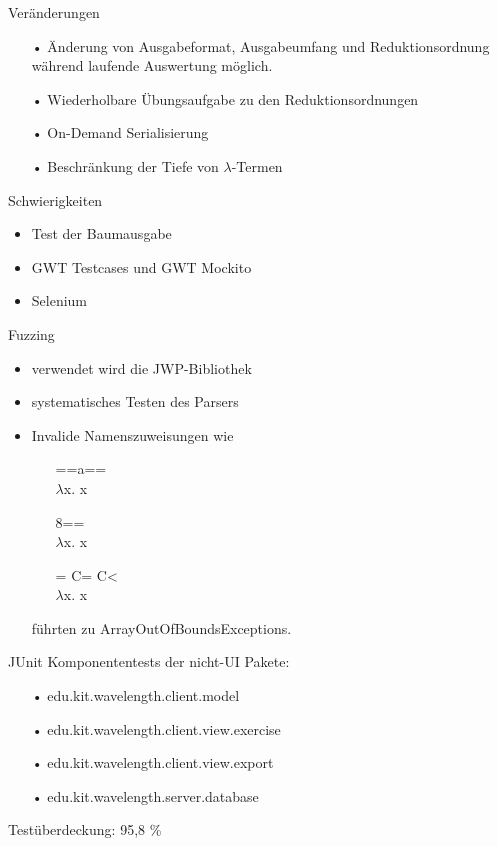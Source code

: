 \documentclass[10pt]{beamer}
\begin{document}
\begin{frame}{Veränderungen}
\begin{itemize}
	\item[•] Änderung von Ausgabeformat, Ausgabeumfang und Reduktionsordnung während laufende Auswertung möglich.
	\item[•] Wiederholbare Übungsaufgabe zu den Reduktionsordnungen
	\item[•] On-Demand Serialisierung
	\item[•] Beschränkung der Tiefe von $\lambda$-Termen
\end{itemize}
\end{frame}

\begin{frame}{Schwierigkeiten}
\begin{itemize}
	\setlength{\itemsep}{10pt}
	\item Test der Baumausgabe
	\item GWT Testcases und GWT Mockito 
	\item Selenium
\end{itemize}
\end{frame}

\begin{frame}{Fuzzing} %
\begin{itemize} 
	\item verwendet wird die JWP-Bibliothek
	\item systematisches Testen des Parsers
	\newline
	\item Invalide Namenszuweisungen wie
	\begin{multicols}{3}
	\begin{itemize}
		\item[] ==a== \\ $\lambda$x. x
		\item[] 8== \\ $\lambda$x. x
		\item[] = C= C< \\ $\lambda$x. x
	\end{itemize}
	\end{multicols}
	führten zu ArrayOutOfBoundsExceptions.
\end{itemize}
\end{frame}

\begin{frame}{JUnit}
Komponententests der nicht-UI Pakete:
\begin{itemize}
	\item[•] edu.kit.wavelength.client.model
	\item[•] edu.kit.wavelength.client.view.exercise
	\item[•] edu.kit.wavelength.client.view.export
	\item[•] edu.kit.wavelength.server.database
\end{itemize}
Testüberdeckung: 95,8 \%
\end{frame}
\end{document}
